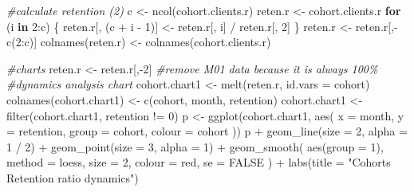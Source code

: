 \documentclass[
]{book}
\newenvironment{Shaded}{\begin{snugshade}}{\end{snugshade}}
\newcommand{\AttributeTok}[1]{\textcolor[rgb]{0.77,0.63,0.00}{#1}}
\newcommand{\CommentTok}[1]{\textcolor[rgb]{0.56,0.35,0.01}{\textit{#1}}}
\newcommand{\ConstantTok}[1]{\textcolor[rgb]{0.00,0.00,0.00}{#1}}
\newcommand{\ControlFlowTok}[1]{\textcolor[rgb]{0.13,0.29,0.53}{\textbf{#1}}}
\newcommand{\DecValTok}[1]{\textcolor[rgb]{0.00,0.00,0.81}{#1}}
\newcommand{\FunctionTok}[1]{\textcolor[rgb]{0.00,0.00,0.00}{#1}}
\newcommand{\NormalTok}[1]{#1}
\newcommand{\OtherTok}[1]{\textcolor[rgb]{0.56,0.35,0.01}{#1}}
\newcommand{\SpecialCharTok}[1]{\textcolor[rgb]{0.00,0.00,0.00}{#1}}
\newcommand{\StringTok}[1]{\textcolor[rgb]{0.31,0.60,0.02}{#1}}
\begin{document}
\begin{Shaded}
\begin{Highlighting}[]
\CommentTok{\#calculate retention (2)}
\NormalTok{c }\OtherTok{\textless{}{-}} \FunctionTok{ncol}\NormalTok{(cohort.clients.r)}
\NormalTok{reten.r }\OtherTok{\textless{}{-}}\NormalTok{ cohort.clients.r}
\ControlFlowTok{for}\NormalTok{ (i }\ControlFlowTok{in} \DecValTok{2}\SpecialCharTok{:}\NormalTok{c) \{}
\NormalTok{    reten.r[, (c }\SpecialCharTok{+}\NormalTok{ i }\SpecialCharTok{{-}} \DecValTok{1}\NormalTok{)] }\OtherTok{\textless{}{-}}\NormalTok{ reten.r[, i] }\SpecialCharTok{/}\NormalTok{ reten.r[, }\DecValTok{2}\NormalTok{]}
\NormalTok{\}}
\NormalTok{reten.r }\OtherTok{\textless{}{-}}\NormalTok{ reten.r[,}\SpecialCharTok{{-}}\FunctionTok{c}\NormalTok{(}\DecValTok{2}\SpecialCharTok{:}\NormalTok{c)]}
\FunctionTok{colnames}\NormalTok{(reten.r) }\OtherTok{\textless{}{-}} \FunctionTok{colnames}\NormalTok{(cohort.clients.r)}




\CommentTok{\#charts}
\NormalTok{reten.r }\OtherTok{\textless{}{-}}\NormalTok{ reten.r[,}\SpecialCharTok{{-}}\DecValTok{2}\NormalTok{] }\CommentTok{\#remove M01 data because it is always 100\%}
\CommentTok{\#dynamics analysis chart}
\NormalTok{cohort.chart1 }\OtherTok{\textless{}{-}} \FunctionTok{melt}\NormalTok{(reten.r, }\AttributeTok{id.vars =} \StringTok{\textquotesingle{}cohort\textquotesingle{}}\NormalTok{)}
\FunctionTok{colnames}\NormalTok{(cohort.chart1) }\OtherTok{\textless{}{-}} \FunctionTok{c}\NormalTok{(}\StringTok{\textquotesingle{}cohort\textquotesingle{}}\NormalTok{, }\StringTok{\textquotesingle{}month\textquotesingle{}}\NormalTok{, }\StringTok{\textquotesingle{}retention\textquotesingle{}}\NormalTok{)}
\NormalTok{cohort.chart1 }\OtherTok{\textless{}{-}} \FunctionTok{filter}\NormalTok{(cohort.chart1, retention }\SpecialCharTok{!=} \DecValTok{0}\NormalTok{)}
\NormalTok{p }\OtherTok{\textless{}{-}}
    \FunctionTok{ggplot}\NormalTok{(cohort.chart1,}
           \FunctionTok{aes}\NormalTok{(}
               \AttributeTok{x =}\NormalTok{ month,}
               \AttributeTok{y =}\NormalTok{ retention,}
               \AttributeTok{group =}\NormalTok{ cohort,}
               \AttributeTok{colour =}\NormalTok{ cohort}
\NormalTok{           ))}
\NormalTok{p }\SpecialCharTok{+} \FunctionTok{geom\_line}\NormalTok{(}\AttributeTok{size =} \DecValTok{2}\NormalTok{, }\AttributeTok{alpha =} \DecValTok{1} \SpecialCharTok{/} \DecValTok{2}\NormalTok{) }\SpecialCharTok{+}
    \FunctionTok{geom\_point}\NormalTok{(}\AttributeTok{size =} \DecValTok{3}\NormalTok{, }\AttributeTok{alpha =} \DecValTok{1}\NormalTok{) }\SpecialCharTok{+}
    \FunctionTok{geom\_smooth}\NormalTok{(}
        \FunctionTok{aes}\NormalTok{(}\AttributeTok{group =} \DecValTok{1}\NormalTok{),}
        \AttributeTok{method =} \StringTok{\textquotesingle{}loess\textquotesingle{}}\NormalTok{,}
        \AttributeTok{size =} \DecValTok{2}\NormalTok{,}
        \AttributeTok{colour =} \StringTok{\textquotesingle{}red\textquotesingle{}}\NormalTok{,}
        \AttributeTok{se =} \ConstantTok{FALSE}
\NormalTok{    ) }\SpecialCharTok{+}
    \FunctionTok{labs}\NormalTok{(}\AttributeTok{title =} \StringTok{"Cohorts Retention ratio dynamics"}\NormalTok{)}
\end{Highlighting}
\end{Shaded}
\end{document}
